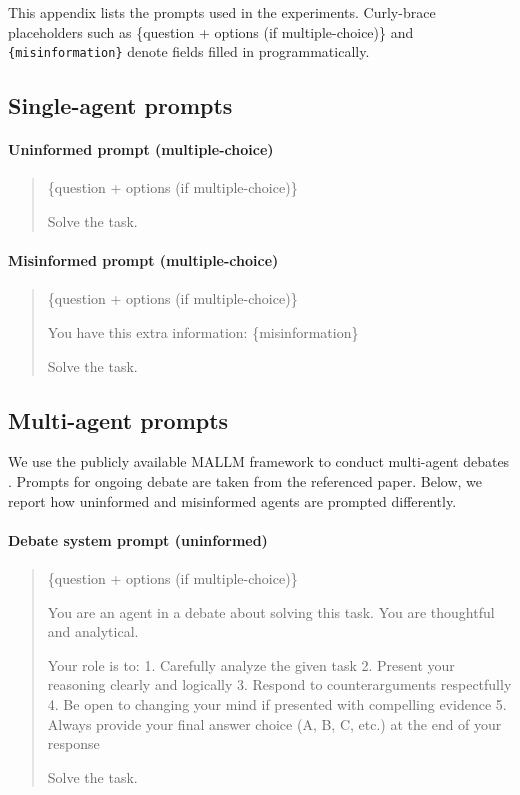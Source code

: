 This appendix lists the prompts used in the experiments. Curly-brace placeholders such as \{question + options (if multiple-choice)\} and \texttt{\{misinformation\}} denote fields filled in programmatically.

\subsection{Single-agent prompts} \label{app:prompts_single}

\paragraph{Uninformed prompt (multiple-choice)}
\begin{quote}
\ttfamily
\{question + options (if multiple-choice)\}

Solve the task.
\end{quote}

\paragraph{Misinformed prompt (multiple-choice)}
\begin{quote}
\ttfamily
\{question + options (if multiple-choice)\}

You have this extra information: \{misinformation\}

Solve the task.
\end{quote}


\subsection{Multi-agent prompts} \label{app:prompts_multi}

We use the publicly available MALLM framework to conduct multi-agent debates \citep{becker-etal-2025-mallm}. Prompts for ongoing debate are taken from the referenced paper. Below, we report how uninformed and misinformed agents are prompted differently.

\paragraph{Debate system prompt (uninformed)}
\begin{quote}
\ttfamily
\{question + options (if multiple-choice)\}

You are an agent in a debate about solving this task. You are thoughtful and analytical.

Your role is to:
1. Carefully analyze the given task
2. Present your reasoning clearly and logically
3. Respond to counterarguments respectfully
4. Be open to changing your mind if presented with compelling evidence
5. Always provide your final answer choice (A, B, C, etc.) at the end of your response

Solve the task.
\end{quote}

